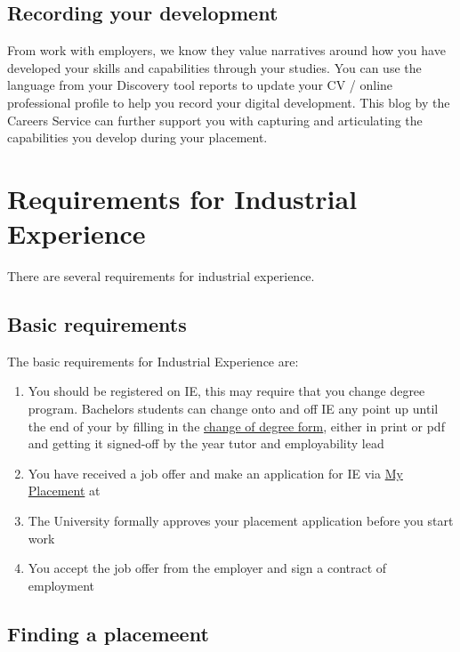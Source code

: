 \documentclass[
]{book}
\providecommand{\tightlist}{%
  \setlength{\itemsep}{0pt}\setlength{\parskip}{0pt}}
\begin{document}
\section{Recording your development}\label{development}

From work with employers, we know they value narratives around how you have developed your skills and capabilities through your studies. You can use the language from your Discovery tool reports to update your CV / online professional profile to help you record your digital development. This blog by the Careers Service can further support you with capturing and articulating the capabilities you develop during your placement. \citep{conway}

\chapter{Requirements for Industrial Experience}\label{requirements}

There are several requirements for industrial experience.

\section{Basic requirements}\label{basic}

The basic requirements for Industrial Experience are:

\begin{enumerate}
\def\labelenumi{\arabic{enumi}.}
\tightlist
\item
  You should be registered on IE, this may require that you change degree program. Bachelors students can change onto and off IE any point up until the end of your by filling in the \href{https://studentnet.cs.manchester.ac.uk/ugt/changedegree.php}{change of degree form}, either in print or pdf and getting it signed-off by the year tutor and employability lead \citep{changedegree}
\item
  You have received a job offer and make an application for IE via \href{https://studentmobility.manchester.ac.uk}{My Placement} at \citep{myplacement}
\item
  The University formally approves your placement application before you start work
\item
  You accept the job offer from the employer and sign a contract of employment
\end{enumerate}

\section{Finding a placemeent}\label{finding}
\end{document}

